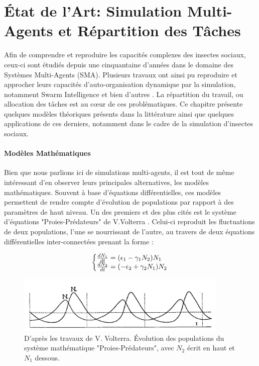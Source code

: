 \chapter{État de l'Art: Simulation Multi-Agents et Répartition des Tâches}
\label{ChapitreEASMA}

	Afin de comprendre et reproduire les capacités complexes des insectes sociaux, ceux-ci sont étudiés depuis une cinquantaine d'années dans le domaine des Systèmes Multi-Agents (SMA). Plusieurs travaux ont ainsi pu reproduire et approcher leurs capacités d'auto-organisation dynamique par la simulation, notamment Swarm Intelligence \cite{bonabeau_natural_1999} et bien d'autres \cite{drogoul_simulation_1993, schmickl_taskselsim_2008, dornhaus_task_1998}. La répartition du travail, ou allocation des tâches est au cœur de ces problématiques. Ce chapitre présente quelques modèles théoriques présents dans la littérature ainsi que quelques applications de ces derniers, notamment dans le cadre de la simulation d'insectes sociaux.
	
    \subsubsection*{Modèles Mathématiques}
		Bien que nous parlions ici de simulations multi-agents, il est tout de même intéressant d'en observer leurs principales alternatives, les modèles mathématiques. Souvent à base d'équations différentielles, ces modèles permettent de rendre compte d'évolution de populations par rapport à des paramètres de haut niveau. Un des premiers et des plus cités est le système d'équations "Proies-Prédateurs" de V.Volterra \cite{volterra_variations_1928}. Celui-ci reproduit les fluctuations de deux populations, l'une se nourrissant de l'autre, au travers de deux équations différentielles inter-connectées prenant la forme :
		
		\begin{equation}
  			\left\{\begin{array}{@{}l@{}}
    			\frac{dN_1}{dt}=(\epsilon_1-\gamma_1 N_2) N_1\\
      			\frac{dN_2}{dt}=(- \epsilon_2 + \gamma_2 N_1) N_2
  			\end{array}\right.\,
		\end{equation}
		
		\begin{figure}
		\centering
		\includegraphics[width=0.9\textwidth]{./Pictures/Graphs/Volterra.JPG}
		\caption{D'après les travaux de V. Volterra\cite{volterra_variations_1928}. Évolution des populations du système mathématique "Proies-Prédateurs", avec $N_2$ écrit en haut et $N_1$ dessous.}
		\label{volterra}
		\end{figure}
		
